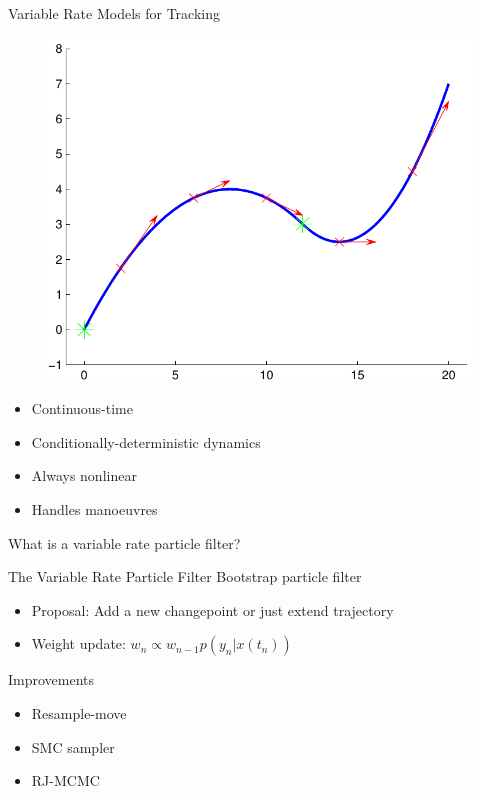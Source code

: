 \documentclass{beamer}
\begin{document}
\begin{frame}{Variable Rate Models for Tracking}
\begin{figure}\centering\includegraphics[scale=0.5]{variable_rate_model.pdf}\end{figure}
\begin{itemize}
  \item Continuous-time
  \item Conditionally-deterministic dynamics
  \item Always nonlinear
  \item Handles manoeuvres
\end{itemize}
\end{frame}

\begin{frame}
What is a variable rate particle filter?
\end{frame}

\begin{frame}{The Variable Rate Particle Filter}
\pause Bootstrap particle filter
\begin{itemize}
  \item Proposal: Add a new changepoint or just extend trajectory
  \item Weight update: $w_n \propto w_{n-1} p(y_n|x(t_n))$
\end{itemize}
\pause Improvements
\begin{itemize}
  \item Resample-move
  \item SMC sampler
  \item RJ-MCMC
\end{itemize}
\end{frame}
\end{document}
